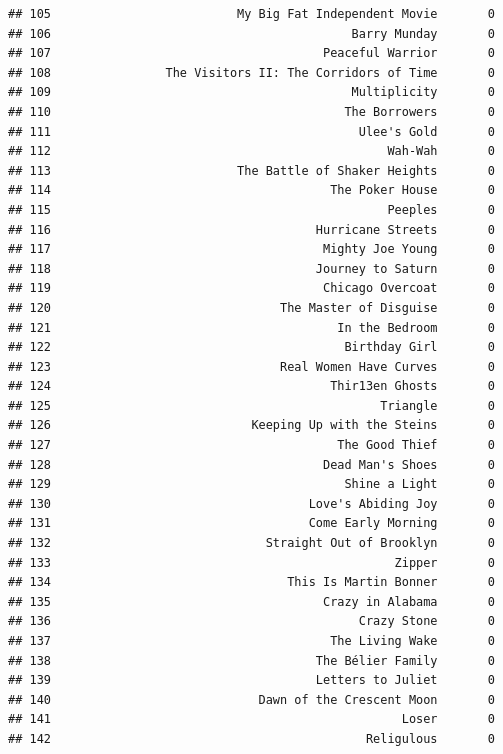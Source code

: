 \documentclass[
]{article}
\begin{document}
\begin{verbatim}
## 105                          My Big Fat Independent Movie       0
## 106                                          Barry Munday       0
## 107                                      Peaceful Warrior       0
## 108                The Visitors II: The Corridors of Time       0
## 109                                          Multiplicity       0
## 110                                         The Borrowers       0
## 111                                           Ulee's Gold       0
## 112                                               Wah-Wah       0
## 113                          The Battle of Shaker Heights       0
## 114                                       The Poker House       0
## 115                                               Peeples       0
## 116                                     Hurricane Streets       0
## 117                                      Mighty Joe Young       0
## 118                                     Journey to Saturn       0
## 119                                      Chicago Overcoat       0
## 120                                The Master of Disguise       0
## 121                                        In the Bedroom       0
## 122                                         Birthday Girl       0
## 123                                Real Women Have Curves       0
## 124                                       Thir13en Ghosts       0
## 125                                              Triangle       0
## 126                            Keeping Up with the Steins       0
## 127                                        The Good Thief       0
## 128                                      Dead Man's Shoes       0
## 129                                         Shine a Light       0
## 130                                    Love's Abiding Joy       0
## 131                                    Come Early Morning       0
## 132                              Straight Out of Brooklyn       0
## 133                                                Zipper       0
## 134                                 This Is Martin Bonner       0
## 135                                      Crazy in Alabama       0
## 136                                           Crazy Stone       0
## 137                                       The Living Wake       0
## 138                                     The Bélier Family       0
## 139                                     Letters to Juliet       0
## 140                             Dawn of the Crescent Moon       0
## 141                                                 Loser       0
## 142                                            Religulous       0

\end{verbatim}
\end{document}
